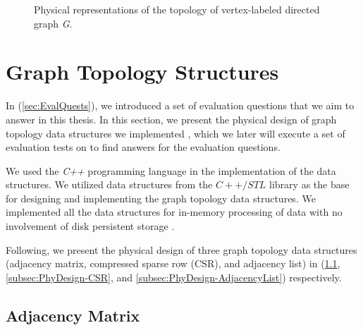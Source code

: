{\begin{figure}[H]
{        \label{fig:CSR_phy}
    }
\centering
    \caption{Physical representations of the topology of vertex-labeled directed graph \textit{G}.}
    \label{fig:GraphTopology_physical}
\end{figure}


\section{Graph Topology Structures}
\label{sec:PhyDesign-GraphTopology}

In (\ref{sec:EvalQuests}), we introduced a set of evaluation questions that we aim to answer in this thesis. In this section, we present the physical design of graph topology data structures we implemented , which we later will execute a set of evaluation tests on to find answers for the evaluation questions.

We used the \textit{C++} programming language in the implementation of the data structures. We utilized data structures from the $C++/STL$ library as the base for designing and implementing the graph topology data structures. We implemented all the data structures for in-memory processing of data with no involvement of disk persistent storage \cite{josuttis2012c++}.

Following, we present the physical design of three graph topology data structures (adjacency matrix, compressed sparse row (CSR), and adjacency list) in (\ref{subsec:PhyDesign-AdjacencyMatrix}, \ref{subsec:PhyDesign-CSR}, and \ref{subsec:PhyDesign-AdjacencyList}) respectively.



\subsection{Adjacency Matrix}
\label{subsec:PhyDesign-AdjacencyMatrix}

}
